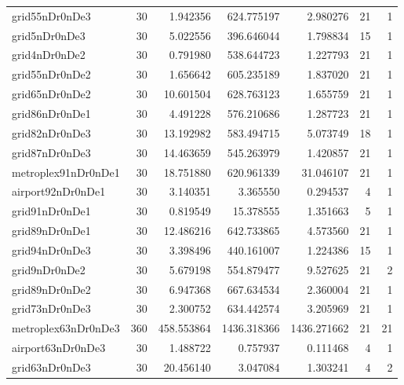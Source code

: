 \begin{longtable}{|l|r|r|r|r|r|r|}
grid55nDr0nDe3 & 30 & 1.942356 & 624.775197 & 2.980276 & 21 & 1 \\
grid5nDr0nDe3 & 30 & 5.022556 & 396.646044 & 1.798834 & 15 & 1 \\
grid4nDr0nDe2 & 30 & 0.791980 & 538.644723 & 1.227793 & 21 & 1 \\
grid55nDr0nDe2 & 30 & 1.656642 & 605.235189 & 1.837020 & 21 & 1 \\
grid65nDr0nDe2 & 30 & 10.601504 & 628.763123 & 1.655759 & 21 & 1 \\
grid86nDr0nDe1 & 30 & 4.491228 & 576.210686 & 1.287723 & 21 & 1 \\
grid82nDr0nDe3 & 30 & 13.192982 & 583.494715 & 5.073749 & 18 & 1 \\
grid87nDr0nDe3 & 30 & 14.463659 & 545.263979 & 1.420857 & 21 & 1 \\
metroplex91nDr0nDe1 & 30 & 18.751880 & 620.961339 & 31.046107 & 21 & 1 \\
airport92nDr0nDe1 & 30 & 3.140351 & 3.365550 & 0.294537 & 4 & 1 \\
grid91nDr0nDe1 & 30 & 0.819549 & 15.378555 & 1.351663 & 5 & 1 \\
grid89nDr0nDe1 & 30 & 12.486216 & 642.733865 & 4.573560 & 21 & 1 \\
grid94nDr0nDe3 & 30 & 3.398496 & 440.161007 & 1.224386 & 15 & 1 \\
grid9nDr0nDe2 & 30 & 5.679198 & 554.879477 & 9.527625 & 21 & 2 \\
grid89nDr0nDe2 & 30 & 6.947368 & 667.634534 & 2.360004 & 21 & 1 \\
grid73nDr0nDe3 & 30 & 2.300752 & 634.442574 & 3.205969 & 21 & 1 \\
metroplex63nDr0nDe3 & 360 & 458.553864 & 1436.318366 & 1436.271662 & 21 & 21 \\
airport63nDr0nDe3 & 30 & 1.488722 & 0.757937 & 0.111468 & 4 & 1 \\
grid63nDr0nDe3 & 30 & 20.456140 & 3.047084 & 1.303241 & 4 & 2 \\
\end{longtable}
